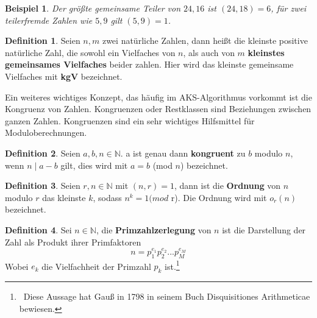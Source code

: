 \documentclass[12pt,oneside]{article}
\newtheorem{example}[theorem]{Beispiel}
\theoremstyle{remark}
\theoremstyle{definition}
\newtheorem{definition}{Definition}[section]
\begin{document}
\begin{example}
Der größte gemeinsame Teiler von $24,16$ ist $(24,18) = 6$, für zwei teilerfremde Zahlen wie $5,9$ gilt $(5,9) = 1$. 
\end{example}

\smallskip 



\smallskip

\begin{definition}
Seien $n, m$ zwei natürliche Zahlen, dann heißt die kleinste positive natürliche Zahl, die sowohl ein Vielfaches von $n$, als auch von $m$ \textbf{kleinstes gemeinsames Vielfaches} beider zahlen. Hier wird das kleinste gemeinsame Vielfaches mit \textbf{kgV} bezeichnet.
\end{definition}

\smallskip 

Ein weiteres wichtiges Konzept, das häufig im AKS-Algorithmus vorkommt ist die Kongruenz von Zahlen. Kongruenzen oder Restklassen sind Beziehungen zwischen ganzen Zahlen. Kongruenzen sind ein sehr wichtiges Hilfsmittel für Moduloberechnungen. 

\begin{definition}\label{Df_3}
Seien $a, b, n \in \mathbb{N}$. a ist genau dann \textbf{kongruent} zu $b$ modulo $n$, wenn $n \mid a - b $ gilt, dies wird mit $a = b$ (mod $n$) bezeichnet.  
\end{definition}

\smallskip 

\begin{definition}\label{Df_4}
Seien $r,n \in \mathbb{N}$ mit $(n,r) = 1$, dann ist die \textbf{Ordnung} von $n$ modulo $r$ das kleinste $k$, sodass $n^k = 1 (mod $ r). Die Ordnung wird mit $o_{r}(n)$ bezeichnet.
\end{definition}

\smallskip


\begin{definition}\label{Df_5}
Sei $n \in \mathbb{N}$, die \textbf{Primzahlzerlegung} von $n$ ist die Darstellung der Zahl als Produkt ihrer Primfaktoren \newline
\begin{equation}
    n = p_{1}^{e_{1}}p_{2}^{e_{2}}...p_{M}^{e_{M}}
\end{equation}
Wobei $e_{k}$ die Vielfachheit der Primzahl $p_{k}$ ist.\footnote{$\,$ Diese Aussage hat Gauß in 1798 in seinem Buch Disquisitiones Arithmeticae bewiesen.\cite{gau-book}}
\end{definition}
\end{document}
